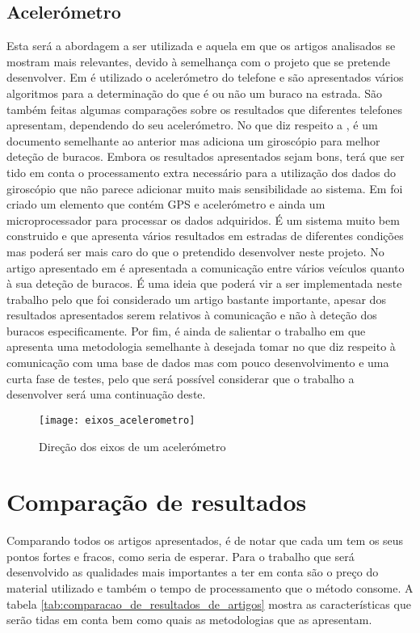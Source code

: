 \subsection{Acelerómetro}
\label{subsec: acelerometro}
Esta será a abordagem a ser utilizada e aquela em que os artigos analisados se mostram mais relevantes, devido à semelhança com o projeto que se pretende desenvolver. Em \cite{Mednis2011} é utilizado o acelerómetro do telefone e são apresentados vários algoritmos para a determinação do que é ou não um buraco na estrada. São também feitas algumas comparações sobre os resultados que diferentes telefones apresentam, dependendo do seu acelerómetro. No que diz respeito a \cite{Fouad}, é um documento semelhante ao anterior mas adiciona um giroscópio para melhor deteção de buracos. Embora os resultados apresentados sejam bons, terá que ser tido em conta o processamento extra necessário para a utilização dos dados do giroscópio que não parece adicionar muito mais sensibilidade ao sistema. Em \cite{Chen2011} foi criado um elemento que contém GPS e acelerómetro e ainda um microprocessador para processar os dados adquiridos. É um sistema muito bem construido e que apresenta vários resultados em estradas de diferentes condições mas poderá ser mais caro do que o pretendido desenvolver neste projeto. No artigo apresentado em \cite{Jang} é apresentada a comunicação entre vários veículos quanto à sua deteção de buracos. É uma ideia que poderá vir a ser implementada neste trabalho pelo que foi considerado um artigo bastante importante, apesar dos resultados apresentados serem relativos à comunicação e não  à deteção dos buracos especificamente. Por fim, é ainda de salientar o trabalho em \cite{Kattan2014} que apresenta uma metodologia semelhante à desejada tomar no que diz respeito à comunicação com uma base de dados mas com pouco desenvolvimento e uma curta fase de testes, pelo que será possível considerar que o trabalho a desenvolver será uma continuação deste.
\begin{figure}[hbtp]
	\centering
	\texttt{[image: eixos\_acelerometro]}
	\caption{Direção dos eixos de um acelerómetro}
	\label{fig:direcao_dos_eixos_de_um_acelerometro}
\end{figure}

\section{Comparação de resultados} %
\label{sec:comapracao_de_resultados}

Comparando todos os artigos apresentados, é de notar que cada um tem os seus pontos fortes e fracos, como seria de esperar. Para o trabalho que será desenvolvido as qualidades mais importantes a ter em conta são o preço do material utilizado e também o tempo de processamento que o método consome. A tabela \ref{tab:comparacao_de_resultados_de_artigos} mostra as características que serão tidas em conta bem como quais as metodologias que as apresentam.

